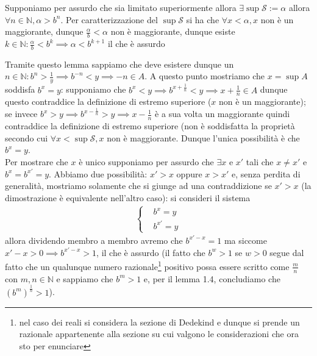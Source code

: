\documentclass{report}
\begin{document}
\begin{mysolution}
\begin{myproof}
Supponiamo per assurdo che sia limitato superiormente allora $\exists \sup{\mathcal{S}} := \alpha$ allora $\forall n \in \mathbb{N}, \alpha > b^n$. Per caratterizzazione del $\sup{\mathcal{S}}$ si ha che $\forall x < \alpha, x$ non è un maggiorante, dunque $\frac{\alpha}{b} < \alpha$ non è maggiorante, dunque esiste $k \in \mathbb{N}: \frac{\alpha}{b} < b^k \implies \alpha < b^{k+1}$ il che è assurdo 
\end{myproof}
\noindent Tramite questo lemma sappiamo che deve esistere dunque un $n \in \mathbb{N}: b^n > \frac{1}{y} \implies b^{-n} < y \implies -n \in A$. A questo punto mostriamo che $x = \sup{A}$ soddisfa $b^x=y$: supponiamo che $b^x < y \implies b^{x+\frac{1}{n}} < y \implies x + \frac{1}{n} \in A$ dunque questo contraddice la definizione di estremo superiore ($x$ non è un maggiorante); se invece $b^x > y \implies b^{x - \frac{1}{n}} > y \implies x - \frac{1}{n}$ è a sua volta un maggiorante quindi contraddice la definizione di estremo superiore (non è soddisfatta la proprietà secondo cui $\forall x < \sup{\mathcal{S}}, x$ non è maggiorante. Dunque l'unica possibilità è che $b^x = y$. \\
Per mostrare che $x$ è unico supponiamo per assurdo che $\exists x $ e $x'$ tali che $x \neq x'$ e $b^x = b^{x'} = y$. Abbiamo due possibilità: $x' > x$ oppure $x > x'$ e, senza perdita di generalità, mostriamo solamente che si giunge ad una contraddizione se $x' > x$ (la dimostrazione è equivalente nell'altro caso): si consideri il sistema
\begin{align*}
	\begin{cases}
	&b^x = y \\
	&b^{x'} = y
	\end{cases}
\end{align*}
allora dividendo membro a membro avremo che $b^{x' - x} = 1$ ma siccome $x' - x > 0 \implies b^{x' - x} > 1$, il che è assurdo (il fatto che $b^w>1$ se $w>0$ segue dal fatto che un qualunque numero razionale\footnote{nel caso dei reali si considera la sezione di Dedekind e dunque si prende un razionale appartenente alla sezione su cui valgono le considerazioni che ora sto per enunciare} positivo possa essere scritto come $\frac{m}{n}$ con $m, n \in \mathbb{N}$ e sappiamo che $b^m > 1$ e, per il lemma 1.4, concludiamo che $(b^m)^{\frac{1}{n}} > 1$).
\end{mysolution}
\end{document}
